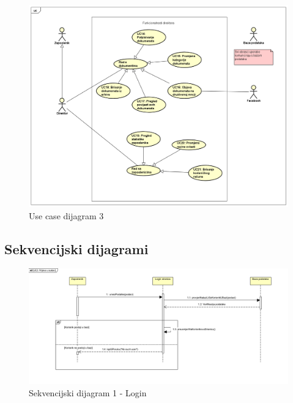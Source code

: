 				\begin{figure}[H]
					\includegraphics[scale=0.5]{slike/dijagram_obrasca_uporabe_3.PNG} %
					\centering
					\caption{Use case dijagram 3}
					\label{fig:promjene}
				\end{figure}
				
			\subsection{Sekvencijski dijagrami}
				
				\begin{figure}[H]
					\includegraphics[scale=0.5]{slike/sd1.PNG} %
					\centering
					\caption{Sekvencijski dijagram 1 - Login}
					\label{fig:promjene}
				\end{figure}

